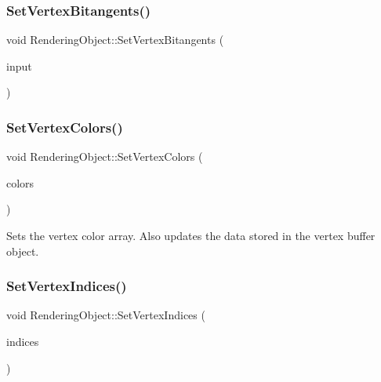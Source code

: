 \subsubsection{\texorpdfstring{Set\+Vertex\+Bitangents()}{SetVertexBitangents()}}
{\footnotesize\ttfamily void Rendering\+Object\+::\+Set\+Vertex\+Bitangents (\begin{DoxyParamCaption}\item[{std\+::unique\+\_\+ptr$<$ \hyperlink{class_rendering_object_a6c6bf305a5f0f9ce1006f374c753c856}{Bitangent\+Array} $>$}]{input }\end{DoxyParamCaption})\hspace{0.3cm}{\ttfamily [virtual]}}

\hypertarget{class_rendering_object_aa1170c47ff02b2305a54c8aab3460201}{}\label{class_rendering_object_aa1170c47ff02b2305a54c8aab3460201}
\subsubsection{\texorpdfstring{Set\+Vertex\+Colors()}{SetVertexColors()}}
{\footnotesize\ttfamily void Rendering\+Object\+::\+Set\+Vertex\+Colors (\begin{DoxyParamCaption}\item[{std\+::unique\+\_\+ptr$<$ \hyperlink{class_rendering_object_a8a12e1f9be788d99af6c089e1c600022}{Color\+Array} $>$}]{colors }\end{DoxyParamCaption})\hspace{0.3cm}{\ttfamily [virtual]}}



Sets the vertex color array. Also updates the data stored in the vertex buffer object.

\hypertarget{class_rendering_object_a61ea597df0c456834eac8eb4087fb573}{}\label{class_rendering_object_a61ea597df0c456834eac8eb4087fb573}
\subsubsection{\texorpdfstring{Set\+Vertex\+Indices()}{SetVertexIndices()}}
{\footnotesize\ttfamily void Rendering\+Object\+::\+Set\+Vertex\+Indices (\begin{DoxyParamCaption}\item[{std\+::unique\+\_\+ptr$<$ \hyperlink{class_rendering_object_a9931c88bca3384065c6691dfe1e60af1}{Index\+Array} $>$}]{indices }\end{DoxyParamCaption})\hspace{0.3cm}{\ttfamily [virtual]}}



